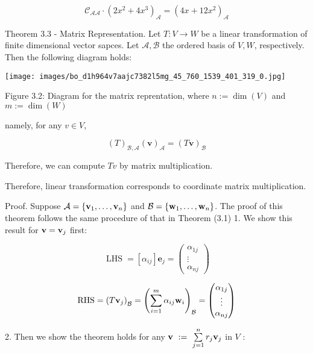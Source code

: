\documentclass[11pt]{article}
\begin{document}
\[
{\mathcal{C}}_{\mathcal{{AA}}} \cdot  {\left( 2{x}^2 + 4{x}^{3}\right) }_{\mathcal{A}} = {\left( 4x + {12}{x}^2\right) }_{\mathcal{A}}
\]

Theorem 3.3 - Matrix Representation. Let \(T : V \rightarrow  W\) be a linear transformation of finite dimensional vector sapces. Let \(\mathcal{A},\mathcal{B}\) the ordered basis of \(V,W\), respectively. Then the following diagram holds:

\begin{center}
\texttt{[image: images/bo\_d1h964v7aajc7382l5mg\_45\_760\_1539\_401\_319\_0.jpg]}
\end{center}
\hspace*{3em} 

Figure 3.2: Diagram for the matrix reprentation, where \(n \mathrel{\text{ := }} \dim \left( V\right)\) and \(m \mathrel{\text{ := }} \dim \left( W\right)\)

namely, for any \(v \in  V\),

\[
{\left( T\right) }_{\mathcal{B},\mathcal{A}}{\left( \mathbf{v}\right) }_{\mathcal{A}} = {\left( T\mathbf{v}\right) }_{\mathcal{B}}
\]

Therefore, we can compute \({Tv}\) by matrix multiplication.

Therefore, linear transformation corresponds to coordinate matrix multiplication.

Proof. Suppose \(\mathcal{A} = \left\{  {{\bf v}_1,\ldots ,{\bf v}_n}\right\}\) and \(\mathcal{B} = \left\{  {{\bf w}_1,\ldots ,{\bf w}_n}\right\}\). The proof of this theorem follows the same procedure of that in Theorem (3.1) 1. We show this result for \(\mathbf{v} = {\bf v}_{j}\) first:

\[
\operatorname{LHS} = \left\lbrack  \alpha_{ij}\right\rbrack  {\mathbf{e}}_{j} = \left( \begin{matrix} \alpha_{1j} \\  \vdots \\  \alpha_{nj} \end{matrix}\right)
\]

\[
\mathrm{{RHS}} = {\left( T{\bf v}_{j}\right) }_{\mathcal{B}} = {\left( \mathop{\sum }\limits_{{i = 1}}^{m}\alpha_{ij}{\bf w}_{i}\right) }_{\mathcal{B}} = \left( \begin{matrix} \alpha_{1j} \\  \vdots \\  \alpha_{nj} \end{matrix}\right)
\]

2. Then we show the theorem holds for any \(\mathbf{v} \mathrel{\text{ := }} \mathop{\sum }\limits_{{j = 1}}^n{r}_{j}{\bf v}_{j}\) in \(V\) :
\end{document}
